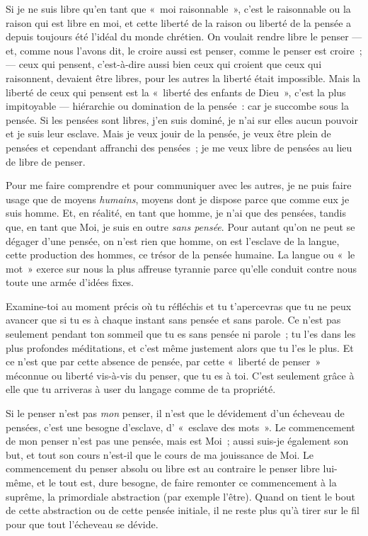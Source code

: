\documentclass[french,twoside]{book} %
\begin{document}
Si je ne suis libre qu’en tant que « moi raisonnable », c’est le raisonnable ou la raison qui est libre en moi, et cette liberté de la raison ou liberté de la pensée a depuis toujours été l’idéal du monde chrétien. On voulait rendre libre le penser — et, comme nous l’avons dit, le croire aussi est penser, comme le penser est croire ; — ceux qui pensent, c’est-à-dire aussi bien ceux qui croient que ceux qui raisonnent, devaient être libres, pour les autres la liberté était impossible. Mais la liberté de ceux qui pensent est la « liberté des enfants de Dieu », c’est la plus impitoyable — hiérarchie ou domination de la pensée : car je succombe sous la pensée. Si les pensées sont libres, j’en suis dominé, je n’ai sur elles aucun pouvoir et je suis leur esclave. Mais je veux jouir de la pensée, je veux être plein de pensées et cependant affranchi des pensées ; je me veux libre de pensées au lieu de libre de penser.\par
Pour me faire comprendre et pour communiquer avec les autres, je ne puis faire usage que de moyens \emph{humains}, moyens dont je dispose parce que comme eux je suis homme. Et, en réalité, en tant que homme, je n’ai que des pensées, tandis que, en tant que Moi, je suis en outre \emph{sans pensée}. Pour autant qu’on ne peut se dégager d’une pensée, on n’est rien que homme, on est l’esclave de la langue, cette production des hommes, ce trésor de la pensée humaine. La langue ou « le mot » exerce sur nous la plus affreuse tyrannie parce qu’elle conduit contre nous toute une armée d’idées fixes.\par
Examine-toi au moment précis où tu réfléchis et tu t’apercevras que tu ne peux avancer que si tu  es à chaque instant sans pensée et sans parole. Ce n’est pas seulement pendant ton sommeil que tu es sans pensée ni parole ; tu l’es dans les plus profondes méditations, et c’est même justement alors que tu l’es le plus. Et ce n’est que par cette absence de pensée, par cette « liberté de penser » méconnue ou liberté vis-à-vis du penser, que tu es à toi. C’est seulement grâce à elle que tu arriveras à user du langage comme de ta propriété.\par
Si le penser n’est pas \emph{mon} penser, il n’est que le dévidement d’un écheveau de pensées, c’est une besogne d’esclave, d’ « esclave des mots ». Le commencement de mon penser n’est pas une pensée, mais est Moi ; aussi suis-je également son but, et tout son cours n’est-il que le cours de ma jouissance de Moi. Le commencement du penser absolu ou libre est au contraire le penser libre lui-même, et le tout est, dure besogne, de faire remonter ce commencement à la suprême, la primordiale abstraction (par exemple l’être). Quand on tient le bout de cette abstraction ou de cette pensée initiale, il ne reste plus qu’à tirer sur le fil pour que tout l’écheveau se dévide.\par
\end{document}
